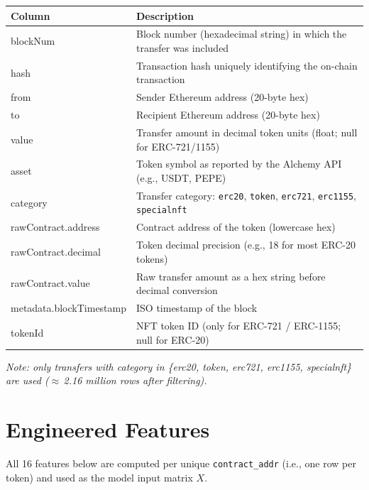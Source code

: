 \documentclass[11pt, a4paper]{article}
\begin{document}
\vspace{0.5em}
\begin{tabular}{>{\ttfamily}p{4.2cm} p{10cm}}
\toprule
\normalfont\textbf{Column} & \textbf{Description} \\
\midrule
blockNum          & Block number (hexadecimal string) in which the transfer was included \\
hash              & Transaction hash uniquely identifying the on-chain transaction \\
from              & Sender Ethereum address (20-byte hex) \\
to                & Recipient Ethereum address (20-byte hex) \\
value             & Transfer amount in decimal token units (float; null for ERC-721/1155) \\
asset             & Token symbol as reported by the Alchemy API (e.g., USDT, PEPE) \\
category          & Transfer category: \texttt{erc20}, \texttt{token}, \texttt{erc721}, \texttt{erc1155}, \texttt{specialnft} \\
rawContract.address & Contract address of the token (lowercase hex) \\
rawContract.decimal & Token decimal precision (e.g., 18 for most ERC-20 tokens) \\
rawContract.value  & Raw transfer amount as a hex string before decimal conversion \\
metadata.blockTimestamp & ISO timestamp of the block \\
tokenId           & NFT token ID (only for ERC-721 / ERC-1155; null for ERC-20) \\
\bottomrule
\end{tabular}

\vspace{0.5em}
\textit{Note: only transfers with category in \{erc20, token, erc721, erc1155, specialnft\}
are used ($\approx$\,2.16 million rows after filtering).}

\section{Engineered Features}

All 16 features below are computed per unique \texttt{contract\_addr}
(i.e., one row per token) and used as the model input matrix $X$.
\end{document}
